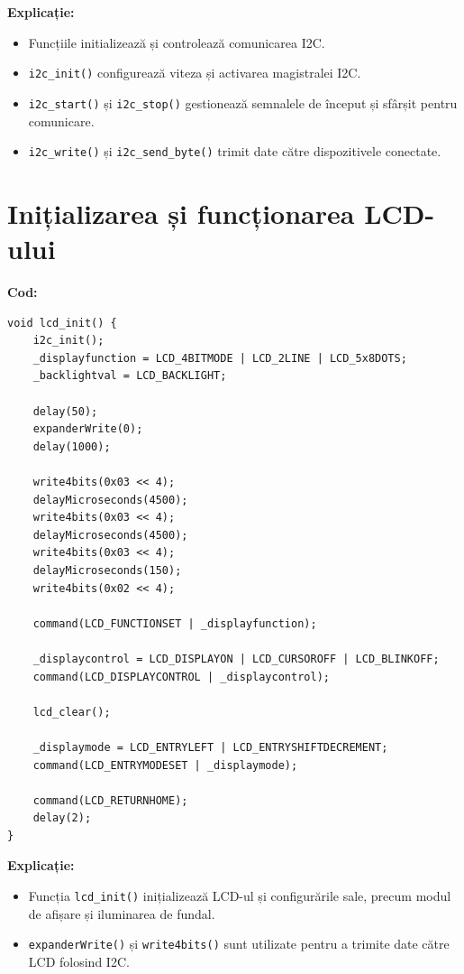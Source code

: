 \documentclass[a4paper,12pt]{report}
\begin{document}
\textbf{Explicație:}
\begin{itemize}
    \item Funcțiile initializează și controlează comunicarea I2C.
    \item \texttt{i2c\_init()} configurează viteza și activarea magistralei I2C.
    \item \texttt{i2c\_start()} și \texttt{i2c\_stop()} gestionează semnalele de început și sfârșit pentru comunicare.
    \item \texttt{i2c\_write()} și \texttt{i2c\_send\_byte()} trimit date către dispozitivele conectate.
\end{itemize}

\section{Inițializarea și funcționarea LCD-ului}
\textbf{Cod:}
\begin{lstlisting}
void lcd_init() {
    i2c_init();
    _displayfunction = LCD_4BITMODE | LCD_2LINE | LCD_5x8DOTS;
    _backlightval = LCD_BACKLIGHT;

    delay(50);
    expanderWrite(0);
    delay(1000);

    write4bits(0x03 << 4);
    delayMicroseconds(4500);
    write4bits(0x03 << 4);
    delayMicroseconds(4500);
    write4bits(0x03 << 4);
    delayMicroseconds(150);
    write4bits(0x02 << 4);

    command(LCD_FUNCTIONSET | _displayfunction);

    _displaycontrol = LCD_DISPLAYON | LCD_CURSOROFF | LCD_BLINKOFF;
    command(LCD_DISPLAYCONTROL | _displaycontrol);

    lcd_clear();

    _displaymode = LCD_ENTRYLEFT | LCD_ENTRYSHIFTDECREMENT;
    command(LCD_ENTRYMODESET | _displaymode);

    command(LCD_RETURNHOME);
    delay(2);
}
\end{lstlisting}

\textbf{Explicație:}
\begin{itemize}
    \item Funcția \texttt{lcd\_init()} inițializează LCD-ul și configurările sale, precum modul de afișare și iluminarea de fundal.
    \item \texttt{expanderWrite()} și \texttt{write4bits()} sunt utilizate pentru a trimite date către LCD folosind I2C.
\end{itemize}
\end{document}
